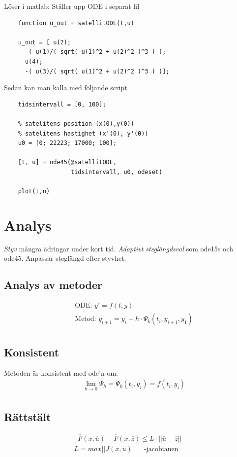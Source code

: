 \begin{multicols}{2}
Löser i matlab:\newline
Ställer upp ODE i separat fil
\begin{lstlisting}
    function u_out = satellitODE(t,u)

    u_out = [ u(2);
      -( u(1)/( sqrt( u(1)^2 + u(2)^2 )^3 ) );
      u(4);
      -( u(3)/( sqrt( u(1)^2 + u(2)^2 )^3 ) )];
\end{lstlisting}

Sedan kan man kalla med följande script
\begin{lstlisting}
    tidsintervall = [0, 100];
    
    % satelitens position (x(0),y(0))
    % satelitens hastighet (x'(0), y'(0))
    u0 = [0; 22223; 17000; 100];

    [t, u] = ode45(@satellitODE, 
                   tidsintervall, u0, odeset)

    plot(t,u)
\end{lstlisting}



\section{Analys}
\textit{Styv} mångra ädringar under kort tid.
\textit{Adaptivt steglängdsval} som ode15s och ode45. Anpassar steglängd efter styvhet.

\subsection{Analys av metoder}
\begin{align*}
  &\quad  \text{ODE: } y'=f(t,y) \\
  &\quad  \text{Metod: } y_{i+1} = y_i +h\cdot{\Psi_k}(t_i, y_{i+1}, y_1) \\
\end{align*}

\subsection{Konsistent}
Metoden är konsistent med ode'n om:
\begin{align*}
  &\quad \lim_{h\to0} \Psi_h = \Psi_0(t_i,y_i) = f(t_i,y_i) \\
\end{align*}

\subsection{Rättstält}
\begin{align*}
  || \overline{F}(x,\overline{u})-\overline{F}(x,\overline{z}) \leq L\cdot||\overline{u}-\overline{z}|| \\
  L = max||J(x,\overline{u})|| \;\;\; \text{ -jacobianen}
\end{align*}


\end{multicols}
